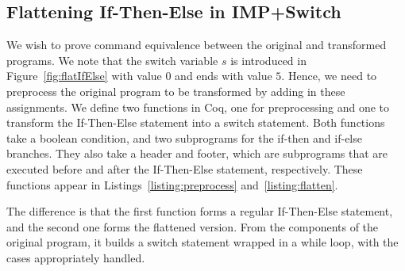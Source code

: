 \documentclass[compsoc,conference,a4paper,10pt,times]{IEEEtran}
\begin{document}
\subsection{Flattening If-Then-Else in IMP+Switch}\label{flattenif}\label{4.3}

We wish to prove command equivalence between the original and transformed programs. We note that the switch variable $s$ is introduced in Figure~\ref{fig:flatIfElse} with value $0$ and ends with value $5$.  Hence, we need to preprocess the original program to be transformed by adding in these assignments.  We define two functions in Coq, one for preprocessing and one to transform the If-Then-Else statement into a switch statement.  
Both functions take a boolean condition, and two subprograms for the if-then and if-else branches.  They also take a header and footer, which are subprograms that are executed before and after the If-Then-Else statement, respectively.  These functions appear in Listings~\ref{listing:preprocess} and~\ref{listing:flatten}.
%
The difference is that the first function forms a regular If-Then-Else statement, and the second one forms the flattened version. From the components of the original program, it builds a switch statement wrapped in a while loop, with the cases appropriately handled.
\end{document}
